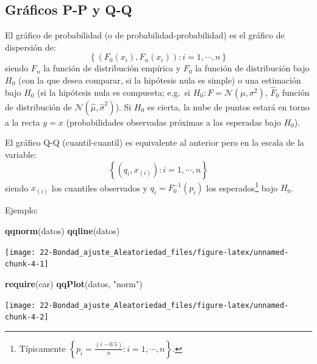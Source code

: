 \documentclass[
]{book}
\newenvironment{Shaded}{\begin{snugshade}}{\end{snugshade}}
\newcommand{\KeywordTok}[1]{\textcolor[rgb]{0.13,0.29,0.53}{\textbf{#1}}}
\newcommand{\NormalTok}[1]{#1}
\newcommand{\StringTok}[1]{\textcolor[rgb]{0.31,0.60,0.02}{#1}}
\theoremstyle{break}
\theoremstyle{definition}
\theoremstyle{definition}
\theoremstyle{definition}
\theoremstyle{remark}
\begin{document}
\hypertarget{gruxe1ficos-p-p-y-q-q}{%
\subsection{Gráficos P-P y Q-Q}\label{gruxe1ficos-p-p-y-q-q}}

El gráfico de probabilidad (o de probabilidad-probabilidad) es el gráfico de dispersión de:
\[\left \{  \left( F_0(x_{i}), F_n(x_{i}) \right)  :i=1,\cdots,n\right \}\]
siendo \(F_n\) la función de distribución empírica y \(F_0\) la función de distribución bajo \(H_0\) (con la que desea comparar, si la hipótesis nula es simple) o una estimación bajo \(H_0\) (si la hipótesis nula es compuesta; e.g.~si \(H_0:F= \mathcal{N}(\mu,\sigma^2)\),
\(\hat{F}_0\) función de distribución de \(\mathcal{N}(\hat{\mu},\hat{\sigma}^2)\)).
Si \(H_0\) es cierta, la nube de puntos estará en torno a la recta \(y=x\) (probabilidades observadas próximas a las esperadas bajo \(H_0\)).

El gráfico Q-Q (cuantil-cuantil) es equivalente al anterior pero en la escala de la variable:
\[\left\{ \left( q_{i}, x_{(i)}\right) : i=1, \cdots, n \right\}\]
siendo \(x_{(i)}\) los cuantiles observados y \(q_{i}=F_0^{-1}(p_{i})\) los esperados\footnote{Típicamente \(\left \{ p_{i}=\frac{\left(i-0.5 \right)}n : i=1, \cdots, n \right\}\).} bajo \(H_0\).

Ejemplo:

\begin{Shaded}
\begin{Highlighting}[]
\KeywordTok{qqnorm}\NormalTok{(datos)}
\KeywordTok{qqline}\NormalTok{(datos)}
\end{Highlighting}
\end{Shaded}

\begin{center}\texttt{[image: 22-Bondad\_ajuste\_Aleatoriedad\_files/figure-latex/unnamed-chunk-4-1]} \end{center}

\begin{Shaded}
\begin{Highlighting}[]
\KeywordTok{require}\NormalTok{(car)}
\KeywordTok{qqPlot}\NormalTok{(datos, }\StringTok{"norm"}\NormalTok{)}
\end{Highlighting}
\end{Shaded}

\begin{center}\texttt{[image: 22-Bondad\_ajuste\_Aleatoriedad\_files/figure-latex/unnamed-chunk-4-2]} \end{center}
\end{document}
